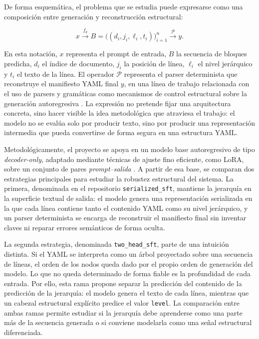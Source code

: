 De forma esquemática, el problema que se estudia puede expresarse como una composición entre generación y reconstrucción estructural:

\[
x \xrightarrow{f_\theta} B = \bigl((d_i, j_i, \ell_i, t_i)\bigr)_{i=1}^{n}
\xrightarrow{\mathcal{P}} y.
\]

En esta notación, \(x\) representa el prompt de entrada, \(B\) la secuencia de bloques predicha, \(d_i\) el índice de documento, \(j_i\) la posición de línea, \(\ell_i\) el nivel jerárquico y \(t_i\) el texto de la línea. El operador \(\mathcal{P}\) representa el parser determinista que reconstruye el manifiesto YAML final \(y\), en una línea de trabajo relacionada con el uso de parsers y gramáticas como mecanismos de control estructural sobre la generación autoregresiva \citep{scholak2021picard, geng2023grammar}. La expresión no pretende fijar una arquitectura concreta, sino hacer visible la idea metodológica que atraviesa el trabajo: el modelo no se evalúa solo por producir texto, sino por producir una representación intermedia que pueda convertirse de forma segura en una estructura YAML.

Metodológicamente, el proyecto se apoya en un modelo base autoregresivo de tipo \textit{decoder-only}, adaptado mediante técnicas de ajuste fino eficiente, como LoRA, sobre un conjunto de pares \textit{prompt--salida} \citep{qwen2024qwen25, hu2021lora, dettmers2023qlora}. A partir de esa base, se
comparan dos estrategias principales para estudiar la robustez estructural del sistema. La primera, denominada en el repositorio \texttt{serialized\_sft}, mantiene la jerarquía en la superficie textual de salida: el modelo genera una representación
serializada en la que cada línea contiene tanto el contenido YAML como su nivel jerárquico, y un parser determinista se encarga de reconstruir el manifiesto final sin inventar claves ni reparar errores semánticos de forma oculta.

La segunda estrategia, denominada \texttt{two\_head\_sft}, parte de una intuición distinta. Si el YAML se interpreta como un árbol proyectado sobre una secuencia de líneas, el orden de los nodos queda dado por el propio orden de generación del modelo. 
Lo que no queda determinado de forma fiable es la profundidad de cada entrada. Por ello, esta rama propone separar la predicción del contenido de la predicción de la jerarquía: el modelo genera el texto de cada línea, mientras que un cabezal estructural
explícito predice el valor \texttt{level}. La comparación entre ambas ramas permite estudiar si la jerarquía debe aprenderse como una parte más de la secuencia generada o si conviene modelarla como una señal estructural diferenciada.

